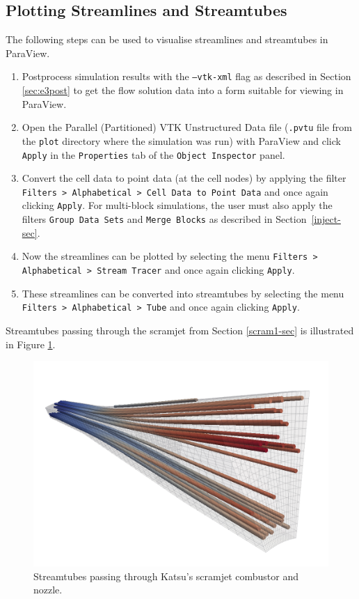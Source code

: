 \subsection{Plotting Streamlines and Streamtubes}
The following steps can be used to visualise streamlines and streamtubes in ParaView.
\begin{enumerate}
\item Postprocess simulation results with the \texttt{--vtk-xml} flag as described in 
Section \ref{sec:e3post} to get the flow solution data into a form suitable for viewing in ParaView.
\item Open the Parallel (Partitioned) VTK Unstructured Data file (\texttt{.pvtu} 
file from the \texttt{plot} directory where the simulation was run) with ParaView 
and click \texttt{Apply} in the \texttt{Properties} tab of the \texttt{Object Inspector} panel.
\item Convert the cell data to point data (at the cell nodes) by applying the
filter \texttt{Filters > Alphabetical > Cell Data to Point Data} and 
once again clicking \texttt{Apply}. For multi-block simulations, the user must
also apply the filters \texttt{Group Data Sets} and \texttt{Merge Blocks} as
described in Section~\ref{inject-sec}.
\item Now the streamlines can be plotted by selecting the menu 
\texttt{Filters > Alphabetical > Stream Tracer} and once again clicking \texttt{Apply}.
\item These streamlines can be converted into streamtubes by selecting the menu 
\texttt{Filters > Alphabetical > Tube} and once again clicking \texttt{Apply}.
\end{enumerate}
Streamtubes passing through the scramjet from Section \ref{scram1-sec} is illustrated 
in Figure \ref{fig:scram-tubes}.
\begin{figure}[htbp]
\begin{center}
\includegraphics[width=12cm]{../3D/scramjet-1/scramjet-streamtubes.png}
\end{center}
\caption{Streamtubes passing through Katsu's scramjet combustor and nozzle.}
\label{fig:scram-tubes}
\end{figure}

